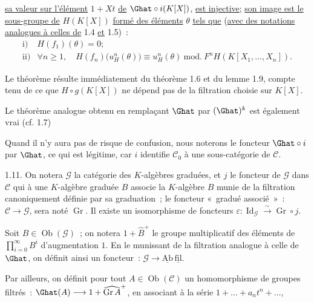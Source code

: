 
\uline{sa valeur sur l'élément} \(1+Xt\) \uline{de} \(\Ghat\circ i(K[X])\), \uline{est injective}; \uline{son image est le sous-groupe de} \(H(K[X])\) \uline{formé des éléments} \(\theta\) \uline{tels que} (\uline{avec des notations analogues à celles de} 1.4 \uline{et} 1.5)~:
\[
\begin{array}{ll}
\text{i)}& H(f_1)(\theta)=0;\\[0.3em]
\text{ii)}& \forall n\geq1,\quad
H(f_n)\bigl(u_H^n(\theta)\bigr)\equiv u_H^n(\theta)
\ \mathrm{mod.}\ F^nH(K[X_1,\ldots,X_n]).
\end{array}
\]

Le théorème résulte immédiatement du théorème 1.6 et du lemme 1.9, compte tenu de ce que \(H\circ g(K[X])\) ne dépend pas de la filtration choisie sur \(K[X]\).

Le théorème analogue obtenu en remplaçant \(\Ghat\) par \((\Ghat)^k\) est également vrai (cf. 1.7)

Quand il n'y aura pas de risque de confusion, nous noterons le foncteur \(\Ghat\circ i\) par \(\Ghat\), ce qui est légitime, car \(i\) identifie \(\mathcal C_0\) à une sous-catégorie de \(\mathcal C\).

1.11. On notera \(\mathcal G\) la catégorie des \(K\)-algèbres graduées, et \(j\) le foncteur de \(\mathcal G\) dans \(\mathcal C\) qui à une \(K\)-algèbre graduée \(B\) associe la \(K\)-algèbre \(B\) munie de la filtration canoniquement définie par sa graduation~; le foncteur «~gradué associé~»~: \(\mathcal C\to\mathcal G\), sera noté \(\operatorname{Gr}\). Il existe un isomorphisme de foncteurs \(\varepsilon:\operatorname{Id}_{\mathcal G}\xrightarrow{\sim}\operatorname{Gr}\circ j\).

Soit \(B\in\operatorname{Ob}(\mathcal G)\)~; on notera \(1+\widehat B^+\) le groupe multiplicatif des éléments de \(\prod\limits_{i=0}^{\infty}B^i\) d'augmentation \(1\). En le munissant de la filtration analogue à celle de \(\Ghat\), on définit ainsi un foncteur~: \(\mathcal G\to\underline{\mathrm{Ab}}\,\underline{\mathrm{fil}}\).

Par ailleurs, on définit pour tout \(A\in\operatorname{Ob}(\mathcal C)\) un homomorphisme de groupes filtrés~: \(\Ghat(A)\longrightarrow 1+\widehat{\operatorname{Gr}A}^{+}\), en associant à la série \(1+\ldots+a_nt^n+\ldots\), 
